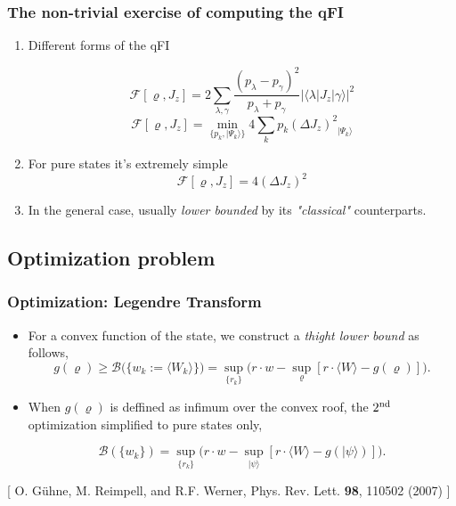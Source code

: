 \documentclass{beamer}
\newcommand{\ket}[1]{\ensuremath{\vert #1 \rangle}}
\newcommand{\braOket}[3]{\ensuremath{\langle #1 \vert #2 \vert #3 \rangle}}
\newcommand{\expect}[1]{\ensuremath{\langle #1 \rangle}}
\newcommand{\varian}[1]{\ensuremath{\left(\Delta #1 \right)^2}}
\newcommand{\citate}[1]{\footnotesize{\color{gray}[ #1 ]}

	}
\begin{document}
	\begin{frame}
		\frametitle{The non-trivial exercise of computing the qFI}

		\begin{enumerate}
			\item<1-> Different forms of the qFI
				\begin{block}
					{}
					\small
					\[
						\mathcal{F}[\varrho,J_z]=2 \sum_{\lambda,\gamma} \frac{(p_\lambda-p_\gamma)^2}{p_\lambda+p_\gamma} |\braOket{\lambda}{J_z}{\gamma}|^2
					\]
					\[
					  \mathcal{F}[\varrho,J_z]=\min_{\{p_k,\ket{\Psi_k}\}} 4\sum_k p_k \varian{J_z}_{\ket{\Psi_k}}
					\]
				\end{block}

			\item<2-> For pure states it's extremely simple
				{\small
				\[
					\mathcal{F}[\varrho,J_z] = 4\varian{J_z}
				\]
				}
			\item<3-> In the general case, usually \emph{\color{blue} lower bounded} by its \emph{"classical"} counterparts.

		\end{enumerate}

	\end{frame}

	\subsection{Optimization problem}

		\begin{frame}
			\frametitle{Optimization: Legendre Transform}
			\begin{itemize}
				\item For a convex function of the state, we construct a \emph{thight lower bound} as follows,
					{\small \[
					g(\varrho) \geq
					\mathcal{B} \big( \{w_k := \expect{W_k}\} \big) = \sup_{\{r_k\}} \big( r \cdot w - \sup_{\varrho} [ r\cdot\expect{W} - g(\varrho) ] \big).
					\]}
				\item When $g(\varrho)$ is deffined as infimum over the convex roof, the $2^{\rm nd}$ optimization simplified to pure states only,
					\begin{block}
						{}
						{\small
						\vspace{8px}
						\[
						\mathcal{B}(\{w_k\}) = \sup_{\{r_k\}} \big( r\cdot w - \sup_{\ket{\psi}} [ r\cdot\expect{W} - g(\ket{\psi}) ] \big).
						\]}
					\end{block}
			\end{itemize}

			\citate{O. G\"uhne, M. Reimpell, and R.F. Werner, Phys. Rev.
Lett. {\bf 98}, 110502 (2007)}

		\end{frame}
\end{document}

